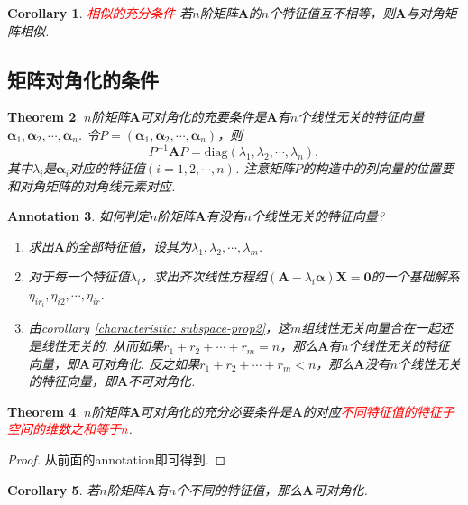 \documentclass{article}
\newtheorem{theorem}{Theorem}[section]
\newtheorem{corollary}[theorem]{Corollary}
\newtheorem{annotation}[theorem]{Annotation}
\newcommand{\mbf}[1]{\bm{#1}}
\newcommand{\redt}[1]{\textcolor{red}{#1}}
\begin{document}
\begin{corollary}
\rm \redt{相似的充分条件} 若$n$阶矩阵$\mbf{A}$的$n$个特征值互不相等，则$\mbf{A}$与对角矩阵相似.
\end{corollary}

\subsection{矩阵对角化的条件}

\begin{theorem}
\rm $n$阶矩阵$\mbf{A}$可对角化的充要条件是$\mbf{A}$有$n$个线性无关的特征向量$\mbf{\alpha}_1,\mbf{\alpha}_2,\cdots,\mbf{\alpha}_n$. 令$P=(\mbf{\alpha}_1,\mbf{\alpha}_2,\cdots,\mbf{\alpha}_n)$，则
$$
P^{-1}\mbf{A}P = \text{diag}(\lambda_1,\lambda_2,\cdots,\lambda_n),
$$
其中$\lambda_i$是$\mbf{\alpha}_i$对应的特征值$(i=1,2,\cdots,n)$. {\color{blue} 注意矩阵$P$的构造中的列向量的位置要和对角矩阵的对角线元素对应}.
\end{theorem}

\begin{annotation}
\rm {\color{red} 如何判定$n$阶矩阵$\mbf{A}$有没有$n$个线性无关的特征向量}?
\begin{enumerate}
	\item 求出$\mbf{A}$的全部特征值，设其为$\lambda_1,\lambda_2,\cdots,\lambda_m$.
	\item 对于每一个特征值$\lambda_i$，求出齐次线性方程组$(\mbf{A}-\lambda_i\mbf{\alpha})\mbf{X}=\mbf{0}$的一个基础解系$\eta_{ir_i},\eta_{i2},\cdots,\eta_{ir}$.
	\item 由corollary \ref{characteristic: subspace-prop2}，这$m$组线性无关向量合在一起还是线性无关的. 从而如果$r_1+r_2+\cdots+r_m = n$，那么$\mbf{A}$有$n$个线性无关的特征向量，即$\mbf{A}$可对角化. 反之如果$r_1+r_2+\cdots+r_m < n$，那么$\mbf{A}$没有$n$个线性无关的特征向量，即$\mbf{A}$不可对角化. 
\end{enumerate}
\end{annotation}

\begin{theorem}
\rm $n$阶矩阵$\mbf{A}$可对角化的充分必要条件是$\mbf{A}$的对应\redt{不同特征值的特征子空间的维数之和等于$n$}.
\end{theorem}

\begin{proof}
\rm 从前面的annotation即可得到.
\end{proof}

\begin{corollary}
\rm 若$n$阶矩阵$\mbf{A}$有$n$个不同的特征值，那么$\mbf{A}$可对角化. 
\end{corollary}
\end{document}
